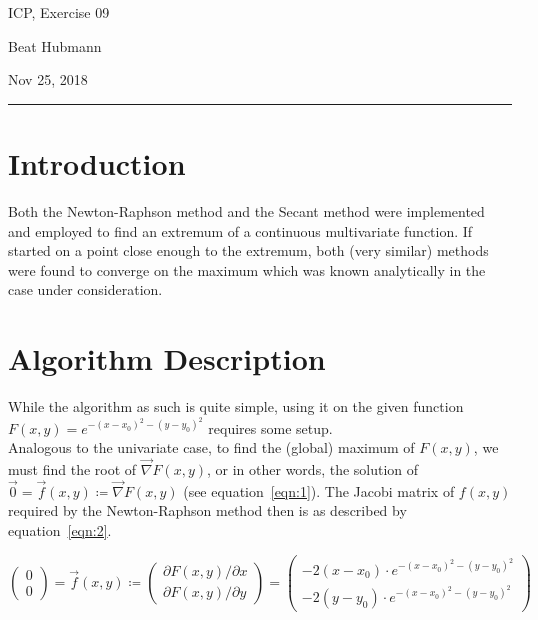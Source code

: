\documentclass[11pt,a4paper]{article}
\begin{document}
\noindent\parbox{\linewidth}{
 \parbox{.25\linewidth}{ \large ICP, Exercise 09 }\hfill
 \parbox{.5\linewidth}{\begin{center} \large Beat Hubmann \end{center}}\hfill
 \parbox{.2\linewidth}{\begin{flushright} \large Nov 25, 2018 \end{flushright}}
}
\noindent\rule{\linewidth}{2pt}


\section{Introduction}

Both the Newton-Raphson method and the Secant method were implemented and employed
to find an extremum of a continuous multivariate function. If started on a point close
enough to the extremum, both (very similar) methods were found to converge on the maximum
which was known analytically in the case under consideration.

\section{Algorithm Description}
While the algorithm as such is quite simple, using it on the given function $F(x, y) = e^{-(x - x_0)^2 -(y -y_0)^2}$ requires
some setup.\\
Analogous to the univariate case, to find the (global) maximum of $F(x,y)$, we must find the root of $\vec{\nabla} F(x, y)$,
or in other words, the solution of $ \vec{0} = \vec{f}(x,y) \coloneqq \vec{\nabla}F(x,y)$ (see equation~\ref{eqn:1}).
The Jacobi matrix of $f(x,y)$ required by the Newton-Raphson method then is as described
by equation~\ref{eqn:2}.


\begin{equation}
	\begin{pmatrix}
		0 \\
		0 
	\end{pmatrix}
	=
	\vec{f}(x,y) \coloneqq 
	\begin{pmatrix}
		\partial F(x,y)/\partial x \\
		\partial F(x,y)/\partial y
	\end{pmatrix}
	=
	\begin{pmatrix}
		-2(x-x_0) \cdot e^{-(x - x_0)^2 -(y -y_0)^2} \\
		-2(y-y_0) \cdot e^{-(x - x_0)^2 -(y -y_0)^2}
	\end{pmatrix}
	\label{eqn:1}
\end{equation}
\end{document}
